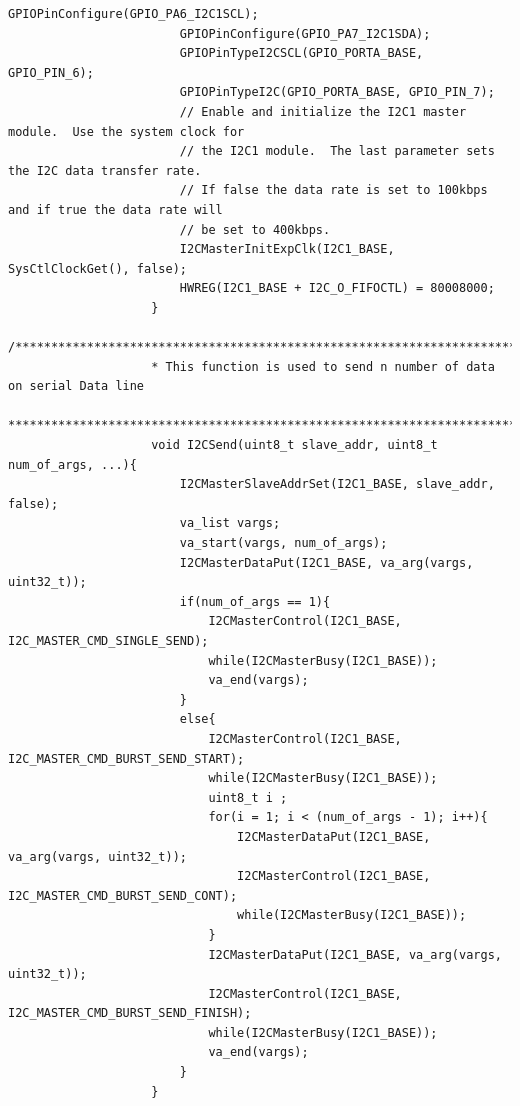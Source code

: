 \documentclass[a4paper,10pt,oneside]{article}
\begin{document}
\begin{lstlisting}[style=CStyle]
						GPIOPinConfigure(GPIO_PA6_I2C1SCL);
						GPIOPinConfigure(GPIO_PA7_I2C1SDA);
						GPIOPinTypeI2CSCL(GPIO_PORTA_BASE, GPIO_PIN_6);
						GPIOPinTypeI2C(GPIO_PORTA_BASE, GPIO_PIN_7);
						// Enable and initialize the I2C1 master module.  Use the system clock for
						// the I2C1 module.  The last parameter sets the I2C data transfer rate.
						// If false the data rate is set to 100kbps and if true the data rate will
						// be set to 400kbps.
						I2CMasterInitExpClk(I2C1_BASE, SysCtlClockGet(), false);
						HWREG(I2C1_BASE + I2C_O_FIFOCTL) = 80008000;
					}
					/***********************************************************************
					* This function is used to send n number of data on serial Data line
					***********************************************************************/
					void I2CSend(uint8_t slave_addr, uint8_t num_of_args, ...){
						I2CMasterSlaveAddrSet(I2C1_BASE, slave_addr, false);
						va_list vargs;
						va_start(vargs, num_of_args);
						I2CMasterDataPut(I2C1_BASE, va_arg(vargs, uint32_t));
						if(num_of_args == 1){
							I2CMasterControl(I2C1_BASE, I2C_MASTER_CMD_SINGLE_SEND);
							while(I2CMasterBusy(I2C1_BASE));
							va_end(vargs);
						}
						else{
							I2CMasterControl(I2C1_BASE, I2C_MASTER_CMD_BURST_SEND_START);
							while(I2CMasterBusy(I2C1_BASE));
							uint8_t i ;
							for(i = 1; i < (num_of_args - 1); i++){
								I2CMasterDataPut(I2C1_BASE, va_arg(vargs, uint32_t));
								I2CMasterControl(I2C1_BASE, I2C_MASTER_CMD_BURST_SEND_CONT);
								while(I2CMasterBusy(I2C1_BASE));
							}
							I2CMasterDataPut(I2C1_BASE, va_arg(vargs, uint32_t));
							I2CMasterControl(I2C1_BASE, I2C_MASTER_CMD_BURST_SEND_FINISH);
							while(I2CMasterBusy(I2C1_BASE));
							va_end(vargs);
						}
					}
					

\end{lstlisting}
\end{document}
